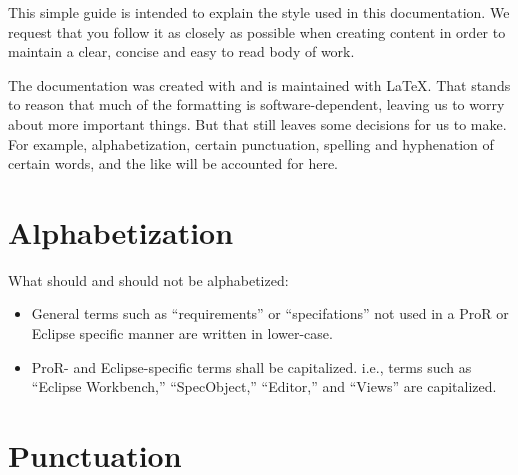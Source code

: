 % 

This simple guide is intended to explain the style used in this documentation.  We request that you follow it as closely as possible when creating content in order to maintain a clear, concise and easy to read body of work.

The documentation was created with and is maintained with \LaTeX.  That stands to reason that much of the formatting is software-dependent, leaving us to worry about more important things.  But that still leaves some decisions for us to make.  For example, alphabetization, certain punctuation, spelling and hyphenation of certain words, and the like will be accounted for here.

\section{Alphabetization}

What should and should not be alphabetized:

\begin{itemize}

\item
  General terms such as ``requirements'' or ``specifations'' not used in a ProR or Eclipse specific manner are written in lower-case.
\item
  ProR- and Eclipse-specific terms shall be capitalized.  i.e., terms such as ``Eclipse Workbench,'' ``SpecObject,'' ``Editor,'' and ``Views'' are capitalized.

\end{itemize}

\section{Punctuation}

